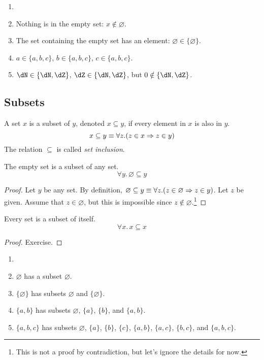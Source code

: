 \documentclass{amsart}
\begin{document}
\begin{eg}
  \begin{enumerate}
  \item[]
  \item Nothing is in the empty set: $x \notin \varnothing$.
  \item The set containing the empty set has an element: $\varnothing \in \{\varnothing\}$.
  \item $a \in \{ a, b, c \}$, $b \in \{ a, b, c \}$, $c \in \{ a, b, c \}$.
  \item $\dN \in \{ \dN, \dZ \}$, $\dZ \in \{ \dN, \dZ \}$, but $0 \notin \{ \dN,\dZ \}$.
  \end{enumerate}
\end{eg}

\subsection{Subsets}
\label{sec:subsets}

\begin{defn}
  A set $x$ is a subset of $y$, denoted $x \subseteq y$, if every element in $x$ is also in $y$.
  \[
    x \subseteq y \equiv \forall z.(z \in x \Rightarrow z \in y)
  \]
  The relation $\subseteq$ is called \emph{set inclusion}.
\end{defn}

\begin{lem}
  The empty set is a subset of any set.
  \[
    \forall y.\,\varnothing \subseteq y
  \]
\end{lem}
\begin{proof}
  Let $y$ be any set.
  By definition, $\varnothing \subseteq y \equiv \forall z.(z \in \varnothing \Rightarrow z \in y)$.
  Let $z$ be given.
  Assume that $z \in \varnothing$, but this is impossible since $z \notin \varnothing$.\footnote{This is not a proof by contradiction, but let's ignore the details for now.}
\end{proof}

\begin{lem}
  Every set is a subset of itself.
  \[
    \forall x.\, x \subseteq x
  \]
\end{lem}
\begin{proof}
  Exercise.
\end{proof}

\begin{eg}\label{eg:subsets}
  \begin{enumerate}
  \item[]
  \item $\varnothing$ has a subset $\varnothing$.
  \item $\{ \varnothing \}$ has subsets $\varnothing$ and $\{ \varnothing \}$.
  \item $\{ a,b \}$ has subsets $\varnothing$, $\{ a \}$, $\{ b \}$, and $\{ a, b \}$.
  \item $\{ a,b,c \}$ has subsets $\varnothing$, $\{ a \}$, $\{ b \}$, $\{ c \}$, $\{ a,b \}$, $\{ a,c \}$, $\{ b,c \}$, and $\{ a,b,c \}$.
  \end{enumerate}
\end{eg}
\end{document}
